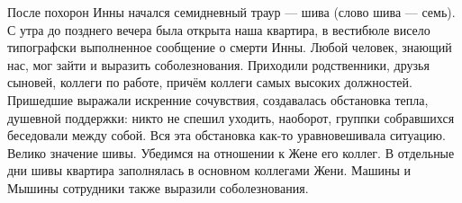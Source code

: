 \label{299-1}
После похорон Инны начался семидневный траур — шива (слово шива — семь). С утра до позднего вечера была открыта наша квартира, в вестибюле висело типографски выполненное сообщение о смерти Инны. Любой человек, знающий нас, мог зайти и выразить соболезнования. Приходили родственники, друзья сыновей, коллеги по работе, причём коллеги самых высоких должностей. Пришедшие выражали искренние сочувствия, создавалась обстановка тепла, душевной поддержки: никто не спешил уходить, наоборот, группки собравшихся беседовали между собой. Вся эта обстановка как-то уравновешивала ситуацию. Велико значение шивы. Убедимся на отношении к Жене его коллег. В отдельные дни шивы квартира заполнялась в основном коллегами Жени. Машины и Мышины сотрудники также выразили соболезнования.
